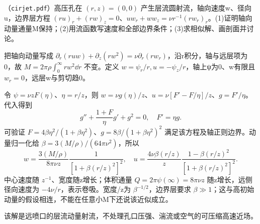 \begin{exercise}\label{task:fluid-cirjet}
（\texttt{cirjet.pdf}）高压孔在 $(r,z)=(0,0)$ 产生层流圆射流，轴向速度w、径向u，边界层方程 $(ru)_r+(rw)_z=0$、$uw_r+ww_z=\nu r^{-1}(rw_r)_r$。(1)证明轴向动量通量M保持；(2)用流函数写速度和全部边界条件；(3)求相似解、画剖面并讨论。
\end{exercise}
\begin{solution}
把轴向动量写成 $\partial_r(ruw)+\partial_z(rw^2)=\nu\partial_r(rw_r)$，沿r积分，轴与远层项为0，故 $M=2\pi\rho\int_0^\infty rw^2\dd r$ 不变。定义 $w=\psi_r/r,u=-\psi_z/r$，轴上ψ为0、w有限且 $w_r=0$，远层w与剪切趋0。

令 $\psi=\nu zF(\eta)$、$\eta=r/z$，则 $w=\nu g(\eta)/z$、$u=\nu[F'-F/\eta]/z$、$g=F'/\eta$。代入得到
\[
 g''+\frac{1+F}{\eta}g'+g^2=0,\quad F'=\eta g.
\]
可验证 $F=4\beta\eta^2/(1+\beta\eta^2)$、$g=8\beta/(1+\beta\eta^2)^2$ 满足该方程及轴正则边界。动量归一化给 $\beta=3(M/\rho)/(64\pi\nu^2)$，所以
\[
 w=\frac{3(M/\rho)}{8\pi\nu z}\frac1{[1+\beta(r/z)^2]^2},\quad
 u=\frac{4\nu\beta(r/z)}z\frac{1-\beta(r/z)^2}{[1+\beta(r/z)^2]^2}.
\]
中心速度随 $z^{-1}$、宽度随z增长；体积通量 $Q=2\pi\psi(\infty)=8\pi\nu z$ 随z增长，远侧径向速度为 $-4\nu/r$，表示卷吸。宽度/z为 $\beta^{-1/2}$，边界层要求 $\beta\gg1$；这与高初始动量的假设相连，不能在任意小M下还说该近似成立。
\begin{center}\end{center}
该解是远喷口的层流动量射流，不处理孔口压强、湍流或空气的可压缩高速近场。
\end{solution}


